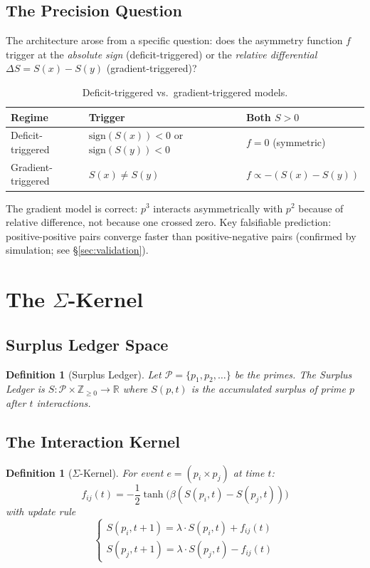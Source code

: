 \documentclass[12pt,letterpaper]{article}
\newtheorem{definition}[theorem]{Definition}
\begin{document}
\subsection{The Precision Question}
The architecture arose from a specific question: does the asymmetry function
$f$ trigger at the \emph{absolute sign} (deficit-triggered) or the
\emph{relative differential} $\Delta S = S(x)-S(y)$ (gradient-triggered)?

\begin{table}[H]\centering
\caption{Deficit-triggered vs.\ gradient-triggered models.}
\begin{tabular}{lll}\toprule
\textbf{Regime} & \textbf{Trigger} & \textbf{Both $S>0$}\\\midrule
Deficit-triggered  & $\mathrm{sign}(S(x))<0$ or $\mathrm{sign}(S(y))<0$ & $f=0$ (symmetric) \\
Gradient-triggered & $S(x)\neq S(y)$ & $f\propto-(S(x)-S(y))$ \\
\bottomrule\end{tabular}
\end{table}

The gradient model is correct: $p^3$ interacts asymmetrically with $p^2$
because of relative difference, not because one crossed zero.
Key falsifiable prediction: positive-positive pairs converge faster than
positive-negative pairs (confirmed by simulation; see \S\ref{sec:validation}).

\section{The \texorpdfstring{$\Sigma$}{Sigma}-Kernel}\label{sec:sigma}

\subsection{Surplus Ledger Space}
\begin{definition}[Surplus Ledger]
Let $\mathcal{P}=\{p_1,p_2,\ldots\}$ be the primes. The Surplus Ledger is
$S:\mathcal{P}\times\mathbb{Z}_{\geq 0}\to\mathbb{R}$ where $S(p,t)$ is the
accumulated surplus of prime $p$ after $t$ interactions.
\end{definition}

\subsection{The Interaction Kernel}
\begin{definition}[$\Sigma$-Kernel]
For event $e=(p_i\times p_j)$ at time $t$:
\begin{equation}
  f_{ij}(t) = -\frac{1}{2}\tanh\!\bigl(\beta(S(p_i,t)-S(p_j,t))\bigr)
  \label{eq:kernel}
\end{equation}
with update rule
\begin{equation}
  \begin{cases}
    S(p_i,t+1)=\lambda\cdot S(p_i,t)+f_{ij}(t)\\[4pt]
    S(p_j,t+1)=\lambda\cdot S(p_j,t)-f_{ij}(t)
  \end{cases}
  \label{eq:update}
\end{equation}
\end{definition}
\end{document}
